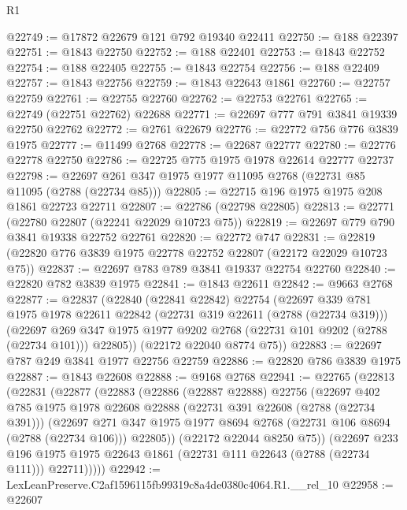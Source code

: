 \begin{lexlean}{R1}
\begin{coremodule}
@22749 := @17872 @22679 @121 @792 @19340 @22411
@22750 := @188 @22397
@22751 := @1843 @22750
@22752 := @188 @22401
@22753 := @1843 @22752
@22754 := @188 @22405
@22755 := @1843 @22754
@22756 := @188 @22409
@22757 := @1843 @22756
@22759 := @1843 @22643 @1861
@22760 := @22757 @22759
@22761 := @22755 @22760
@22762 := @22753 @22761
@22765 := @22749 (@22751 @22762) @22688
@22771 := @22697 @777 @791 @3841 @19339 @22750 @22762
@22772 := @2761 @22679
@22776 := @22772 @756 @776 @3839 @1975
@22777 := @11499 @2768
@22778 := @22687 @22777
@22780 := @22776 @22778 @22750
@22786 := @22725 @775 @1975 @1978 @22614 @22777 @22737
@22798 := @22697 @261 @347 @1975 @1977 @11095 @2768 (@22731 @85 @11095 (@2788 (@22734 @85)))
@22805 := @22715 @196 @1975 @1975 @208 @1861 @22723 @22711
@22807 := @22786 (@22798 @22805)
@22813 := @22771 (@22780 @22807 (@22241 @22029 @10723 @75))
@22819 := @22697 @779 @790 @3841 @19338 @22752 @22761
@22820 := @22772 @747
@22831 := @22819 (@22820 @776 @3839 @1975 @22778 @22752 @22807 (@22172 @22029 @10723 @75))
@22837 := @22697 @783 @789 @3841 @19337 @22754 @22760
@22840 := @22820 @782 @3839 @1975
@22841 := @1843 @22611
@22842 := @9663 @2768
@22877 := @22837
    (@22840
      (@22841 @22842)
      @22754
      (@22697
        @339
        @781
        @1975
        @1978
        @22611
        @22842
        (@22731 @319 @22611 (@2788 (@22734 @319)))
        (@22697 @269 @347 @1975 @1977 @9202 @2768 (@22731 @101 @9202 (@2788 (@22734 @101))) @22805))
      (@22172 @22040 @8774 @75))
@22883 := @22697 @787 @249 @3841 @1977 @22756 @22759
@22886 := @22820 @786 @3839 @1975
@22887 := @1843 @22608
@22888 := @9168 @2768
@22941 := @22765
    (@22813
      (@22831
        (@22877
          (@22883
            (@22886
              (@22887 @22888)
              @22756
              (@22697
                @402
                @785
                @1975
                @1978
                @22608
                @22888
                (@22731 @391 @22608 (@2788 (@22734 @391)))
                (@22697
                  @271
                  @347
                  @1975
                  @1977
                  @8694
                  @2768
                  (@22731 @106 @8694 (@2788 (@22734 @106)))
                  @22805))
              (@22172 @22044 @8250 @75))
            (@22697
              @233
              @196
              @1975
              @1975
              @22643
              @1861
              (@22731 @111 @22643 (@2788 (@22734 @111)))
              @22711)))))
@22942 := LexLeanPreserve.C2af1596115fb99319c8a4de0380c4064.R1.__rel_10
@22958 := @22607

\end{coremodule}
\end{lexlean}
